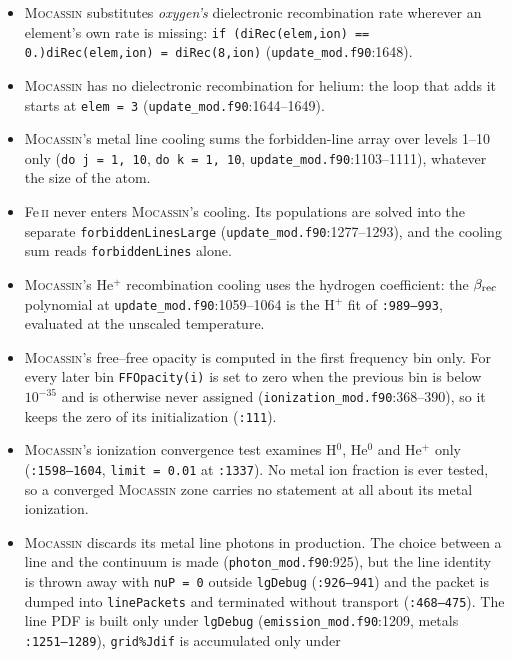 \documentclass[english,a4paper]{my_memo}
\newcommand{\code}[1]{\texttt{#1}}
\newcommand{\Mocassin}{\textsc{Mocassin}}
\begin{document}
\begin{itemize}[leftmargin=2em]
\item \Mocassin{} substitutes \emph{oxygen's} dielectronic recombination rate
  wherever an element's own rate is missing:
  \code{if (diRec(elem,ion) == 0.)\allowbreak   diRec(elem,ion) = diRec(8,ion)}
  (\code{update\_\allowbreak mod.f90}:1648).
\item \Mocassin{} has no dielectronic recombination for helium: the loop that
  adds it starts at \code{elem = 3} (\code{update\_\allowbreak mod.f90}:1644--1649).
\item \Mocassin{}'s metal line cooling sums the forbidden-line array over
  levels 1--10 only (\code{do j = 1, 10}, \code{do k = 1, 10},
  \code{update\_\allowbreak mod.f90}:1103--1111), whatever the size of the atom.
\item Fe\,\textsc{ii} never enters \Mocassin{}'s cooling.  Its populations are
  solved into the separate \code{forbiddenLinesLarge}
  (\code{update\_\allowbreak mod.f90}:1277--1293), and the cooling sum reads
  \code{forbiddenLines} alone.
\item \Mocassin{}'s He$^+$ recombination cooling uses the hydrogen
  coefficient: the $\beta_{\rm rec}$ polynomial at \code{update\_\allowbreak mod.f90}:1059--1064
  is the H$^+$ fit of \code{:989--993}, evaluated at the unscaled
  temperature.
\item \Mocassin{}'s free--free opacity is computed in the first frequency
  bin only.  For every later bin \code{FFOpacity(i)} is set to zero when the
  previous bin is below $10^{-35}$ and is otherwise never assigned
  (\code{ionization\_\allowbreak mod.f90}:368--390), so it keeps the zero of its
  initialization (\code{:111}).
\item \Mocassin{}'s ionization convergence test examines H$^0$, He$^0$ and
  He$^+$ only (\code{:1598--1604}, \code{limit = 0.01} at \code{:1337}).  No
  metal ion fraction is ever tested, so a converged \Mocassin{} zone carries
  no statement at all about its metal ionization.
\item \Mocassin{} discards its metal line photons in production.  The choice
  between a line and the continuum is made (\code{photon\_\allowbreak mod.f90}:925), but
  the line identity is thrown away with \code{nuP = 0} outside \code{lgDebug}
  (\code{:926--941}) and the packet is dumped into \code{linePackets} and
  terminated without transport (\code{:468--475}).  The line PDF is built
  only under \code{lgDebug} (\code{emission\_\allowbreak mod.f90}:1209, metals
  \code{:1251--1289}), \code{grid\%Jdif} is accumulated only under

\end{itemize}
\end{document}
